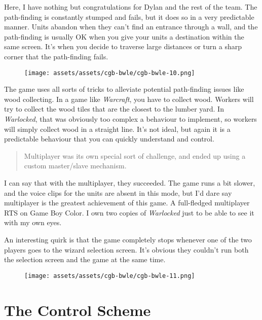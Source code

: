 \documentclass{book}
\begin{document}
Here, I have nothing but congratulations for Dylan and the rest of the team. The path-finding is constantly stumped and fails, but it does so in a very predictable manner. Units abandon when they can’t find an entrance through a wall, and the path-finding is usually OK when you give your units a destination within the same screen. It’s when you decide to traverse large distances or turn a sharp corner that the path-finding fails.

\begin{figure}[hbt]
\vskip 10pt
\centering \texttt{[image: assets/assets/cgb-bwle/cgb-bwle-10.png]}
\vskip 6pt
\end{figure}

The game uses all sorts of tricks to alleviate potential path-finding issues like wood collecting. In a game like \emph{Warcraft}, you have to collect wood. Workers will try to collect the wood tiles that are the closest to the lumber yard. In \emph{Warlocked}, that was obviously too complex a behaviour to implement, so workers will simply collect wood in a straight line. It’s not ideal, but again it is a predictable behaviour that you can quickly understand and control.

\begin{quote}
Multiplayer was its own special sort of challenge, and ended up using a custom master/slave mechanism.
\end{quote} \par

I can say that with the multiplayer, they succeeded. The game runs a bit slower, and the voice clips for the units are absent in this mode, but I’d dare say multiplayer is the greatest achievement of this game. A full-fledged multiplayer RTS on Game Boy Color. I own two copies of \emph{Warlocked} just to be able to see it with my own eyes.

An interesting quirk is that the game completely stops whenever one of the two players goes to the wizard selection screen. It’s obvious they couldn’t run both the selection screen and the game at the same time.

\begin{figure}[hbt]
\vskip 10pt
\centering \texttt{[image: assets/assets/cgb-bwle/cgb-bwle-11.png]}
\vskip 6pt
\end{figure}

\FloatBarrier\needspace{10mm}\section*{The Control Scheme}\nopagebreak[4]
\end{document}
